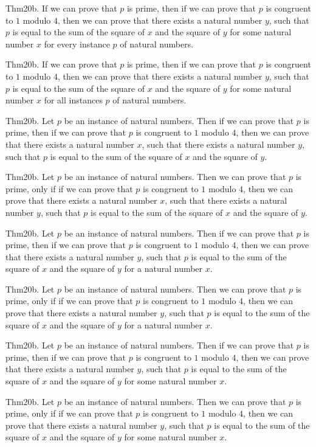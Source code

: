 \documentclass{article}
\begin{document}
Thm20b. If we can prove that $p$ is prime, then if we can prove that $p$ is congruent to $1$ modulo $4$, then we can prove that there exists a natural number $y$, such that $p$ is equal to the sum of the square of $x$ and the square of $y$ for some natural number $x$ for every instance $p$ of natural numbers.

Thm20b. If we can prove that $p$ is prime, then if we can prove that $p$ is congruent to $1$ modulo $4$, then we can prove that there exists a natural number $y$, such that $p$ is equal to the sum of the square of $x$ and the square of $y$ for some natural number $x$ for all instances $p$ of natural numbers.

Thm20b. Let $p$ be an instance of natural numbers. Then if we can prove that $p$ is prime, then if we can prove that $p$ is congruent to $1$ modulo $4$, then we can prove that there exists a natural number $x$, such that there exists a natural number $y$, such that $p$ is equal to the sum of the square of $x$ and the square of $y$.

Thm20b. Let $p$ be an instance of natural numbers. Then we can prove that $p$ is prime, only if if we can prove that $p$ is congruent to $1$ modulo $4$, then we can prove that there exists a natural number $x$, such that there exists a natural number $y$, such that $p$ is equal to the sum of the square of $x$ and the square of $y$.

Thm20b. Let $p$ be an instance of natural numbers. Then if we can prove that $p$ is prime, then if we can prove that $p$ is congruent to $1$ modulo $4$, then we can prove that there exists a natural number $y$, such that $p$ is equal to the sum of the square of $x$ and the square of $y$ for a natural number $x$.

Thm20b. Let $p$ be an instance of natural numbers. Then we can prove that $p$ is prime, only if if we can prove that $p$ is congruent to $1$ modulo $4$, then we can prove that there exists a natural number $y$, such that $p$ is equal to the sum of the square of $x$ and the square of $y$ for a natural number $x$.

Thm20b. Let $p$ be an instance of natural numbers. Then if we can prove that $p$ is prime, then if we can prove that $p$ is congruent to $1$ modulo $4$, then we can prove that there exists a natural number $y$, such that $p$ is equal to the sum of the square of $x$ and the square of $y$ for some natural number $x$.

Thm20b. Let $p$ be an instance of natural numbers. Then we can prove that $p$ is prime, only if if we can prove that $p$ is congruent to $1$ modulo $4$, then we can prove that there exists a natural number $y$, such that $p$ is equal to the sum of the square of $x$ and the square of $y$ for some natural number $x$.
\end{document}
